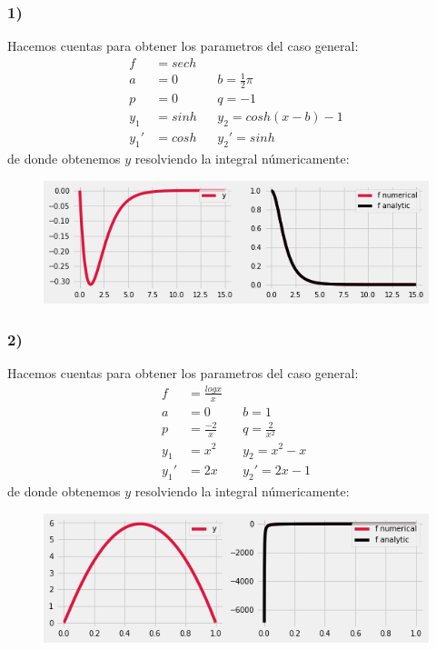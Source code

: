 \documentclass{article}
\begin{document}
\begin{tcolorbox}
    \subsubsection*{1)}
    Hacemos cuentas para obtener los parametros del caso general:
    \begin{align*}
        f&= sech \\
        a&=0 &&b=\frac{1}{2}\pi \\
        p&=0 &&q=-1 \\
        y_1 &= sinh  &&y_2= cosh(x-b)-1 \\
        y_1' &= cosh &&y_2'=sinh 
    \end{align*}
    de donde obtenemos $y$ resolviendo la integral númericamente:
    \begin{figure}[H]
        \centering
        \includegraphics[scale=0.7]{images/p3_1.png}
    \end{figure}

    \subsubsection*{2)}
    Hacemos cuentas para obtener los parametros del caso general:
    \begin{align*}
        f&= \frac{logx}{x} \\
        a&=0 &&b=1 \\
        p&=\frac{-2}{x} &&q= \frac{2}{x^2} \\
        y_1 &= x^2  &&y_2= x^2-x \\
        y_1' &= 2x &&y_2'= 2x-1 
    \end{align*}
    de donde obtenemos $y$ resolviendo la integral númericamente:
    \begin{figure}[H]
        \centering
        \includegraphics[scale=0.7]{images/p3_2.png}
    \end{figure}
\end{tcolorbox}
\end{document}
